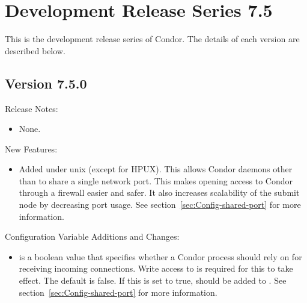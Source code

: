 
\section{\label{sec:History-7-5}Development Release Series 7.5}

This is the development release series of Condor.
The details of each version are described below.

\subsection*{\label{sec:New-7-5-0}Version 7.5.0}

\noindent Release Notes:

\begin{itemize}

\item None.

\end{itemize}


\noindent New Features:

\begin{itemize}

\item Added  under unix (except for HPUX).  This
  allows Condor daemons other than  to share a
  single network port.  This makes opening access to Condor through a
  firewall easier and safer.  It also increases scalability of the
  submit node by decreasing port usage. See
  section~\ref{sec:Config-shared-port} for more information.

\end{itemize}

\noindent Configuration Variable Additions and Changes:

\begin{itemize}

\item {} is a boolean value that specifies
  whether a Condor process should rely on  for
  receiving incoming connections.  Write access to
   is required for this to take effect.
  The default is false.  If this is set to true, 
  should be added to .  See
  section~\ref{sec:Config-shared-port} for more information.


\end{itemize}

